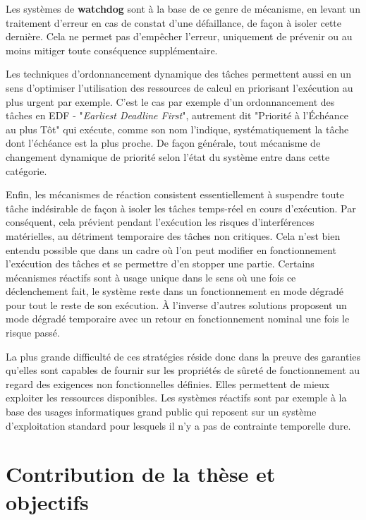 \documentclass[french, a4paper, 11pt, twoside, pdftex]{StyleThese}
\begin{document}
		Les systèmes de \textbf{watchdog} sont à la base de ce genre de mécanisme, en levant un traitement d'erreur en cas de constat d'une défaillance, de façon à isoler cette dernière. Cela ne permet pas d'empêcher l'erreur, uniquement de prévenir ou au moins mitiger  toute conséquence supplémentaire.
		
		Les techniques d'ordonnancement dynamique des tâches permettent aussi en un sens d'optimiser l'utilisation des ressources de calcul en priorisant l'exécution au plus urgent par exemple. C'est le cas par exemple d'un ordonnancement des tâches en EDF - "\textit{Earliest Deadline First}", autrement dit "Priorité à l'Échéance au plus Tôt" qui exécute, comme son nom l'indique, systématiquement la tâche dont l'échéance est la plus proche. De façon générale, tout mécanisme de changement dynamique de priorité selon l'état du système entre dans cette catégorie.
		
		Enfin, les mécanismes de réaction consistent essentiellement à suspendre toute tâche indésirable de façon à isoler les tâches temps-réel en cours d'exécution. Par conséquent, cela prévient pendant l'exécution les risques d'interférences matérielles, au détriment temporaire des tâches non critiques. Cela n'est bien entendu possible que dans un cadre où l'on peut modifier en fonctionnement l'exécution des tâches et se permettre d'en stopper une partie. Certains mécanismes réactifs sont à usage unique dans le sens où une fois ce déclenchement fait, le système reste dans un fonctionnement en mode dégradé pour tout le reste de son exécution. À l'inverse d'autres solutions proposent un mode dégradé temporaire avec un retour en fonctionnement nominal une fois le risque passé. 
		
		La plus grande difficulté de ces stratégies réside donc dans la preuve des garanties qu'elles sont capables de fournir sur les propriétés de sûreté de fonctionnement au regard des exigences non fonctionnelles définies. Elles permettent de mieux exploiter les ressources disponibles. Les systèmes réactifs sont par exemple à la base des usages informatiques grand public qui reposent sur un système d'exploitation standard pour lesquels il n'y a pas de contrainte temporelle dure.


\section{Contribution de la thèse et objectifs}
\end{document}
